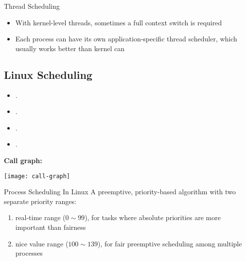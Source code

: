 \begin{frame}{Thread Scheduling}
  \begin{center}
  \end{center}
  \begin{itemize}
  \item With kernel-level threads, sometimes a full context switch is required
  \item Each process can have its own application-specific thread scheduler, which usually works
    better than kernel can
  \end{itemize}
\end{frame}

\subsection{Linux Scheduling}

\begin{itemize}
\item {}.
\item {}.
\item {}.
\item {}.
\end{itemize}

\textbf{Call graph:}
\begin{center}
  \texttt{[image: call-graph]}
\end{center}

\begin{frame}{Process Scheduling In Linux}
  A preemptive, priority-based algorithm with two separate priority ranges:
  \begin{enumerate}
  \item \alert{real-time} range ($0\sim{}99$), for tasks where absolute priorities are
    more important than fairness
  \item \alert{nice value} range ($100\sim{}139$), for fair preemptive scheduling among
    multiple processes
  \end{enumerate}
  \centering
\end{frame}

